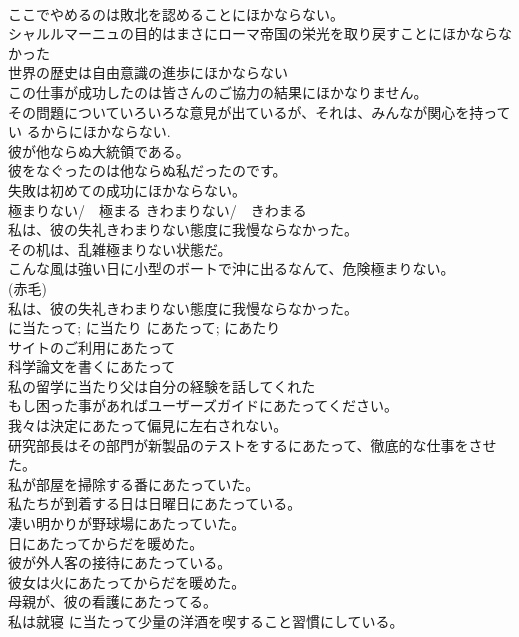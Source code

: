 \documentclass[8pt]{extreport}
\begin{document}
\begin{CJK}{UTF8}{min}
\\	ここでやめるのは敗北を認めることにほかならない。  
\\	シャルルマーニュの目的はまさにローマ帝国の栄光を取り戻すことにほかならなかった  
\\	世界の歴史は自由意識の進歩にほかならない  
\\	この仕事が成功したのは皆さんのご協力の結果にほかなりません。  
\\	その問題についていろいろな意見が出ているが、それは、みんなが関心を持ってい るからにほかならない.  
\\	彼が他ならぬ大統領である。   
\\	彼をなぐったのは他ならぬ私だったのです。   
\\	失敗は初めての成功にほかならない。  
\\	極まりない/　極まる	きわまりない/　きわまる	
\\	私は、彼の失礼きわまりない態度に我慢ならなかった。 
\\	その机は、乱雑極まりない状態だ。  
\\	こんな風は強い日に小型のボートで沖に出るなんて、危険極まりない。  
\\	(赤毛)
\\	私は、彼の失礼きわまりない態度に我慢ならなかった。  
\\	に当たって; に当たり	にあたって; にあたり	
\\	サイトのご利用にあたって  
\\	科学論文を書くにあたって  
\\	私の留学に当たり父は自分の経験を話してくれた  
\\	もし困った事があればユーザーズガイドにあたってください。   
\\	我々は決定にあたって偏見に左右されない。   
\\	研究部長はその部門が新製品のテストをするにあたって、徹底的な仕事をさせた。   
\\	私が部屋を掃除する番にあたっていた。   
\\	私たちが到着する日は日曜日にあたっている。   
\\	凄い明かりが野球場にあたっていた。   
\\	日にあたってからだを暖めた。   
\\	彼が外人客の接待にあたっている。   
\\	彼女は火にあたってからだを暖めた。   
\\	母親が、彼の看護にあたってる。   
\\	私は就寝 に当たって少量の洋酒を喫すること習慣にしている。  

\end{CJK}
\end{document}
